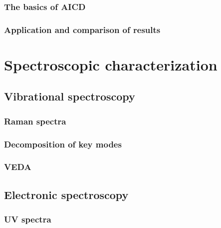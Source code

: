 \subsubsection{The basics of AICD}
\blindtext
\subsubsection{Application and comparison of results}
\blindtext


\section{Spectroscopic characterization}

\subsection{Vibrational spectroscopy}
\subsubsection{Raman spectra}
\blindtext
\subsubsection{Decomposition of key modes}
\blindtext
\subsubsection{VEDA}
\blindtext

\subsection{Electronic spectroscopy}
\subsubsection{UV spectra}
\blindtext
